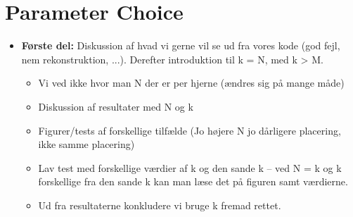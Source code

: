 \section{Parameter Choice}

\begin{itemize}
    \item \textbf{Første del:} Diskussion af hvad vi gerne vil se ud fra vores kode (god fejl, nem rekonstruktion, ...). Derefter introduktion til k = N, med k > M.
    \begin{itemize}
        \item Vi ved ikke hvor man N der er per hjerne (ændres sig på mange måde)
        \item Diskussion af resultater med N og k
        \item Figurer/tests af forskellige tilfælde (Jo højere N jo dårligere placering, ikke samme placering)
        \item Lav test med forskellige værdier af k og den sande k -- ved N = k og k forskellige fra den sande k kan man læse det på figuren samt værdierne.
        \item Ud fra resultaterne konkludere vi bruge k fremad rettet.
    \end{itemize}
\end{itemize}

